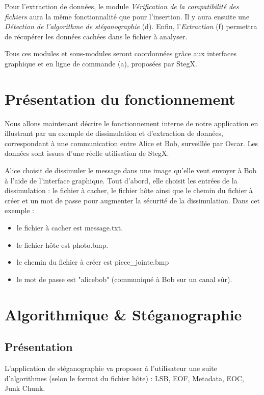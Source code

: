 \documentclass[11pt]{article}
\begin{document}
Pour l'extraction de données, le module \textit{Vérification de la compatibilité 
des fichiers} aura la même fonctionnalité que pour l'insertion.
Il y aura ensuite une \textit{Détection de l'algorithme de stéganographie} 
(d). 
Enfin, l'\textit{Extraction} (f) permettra de récupérer les données cachées 
dans le fichier à analyser. 

Tous ces modules et sous-modules seront coordonnées grâce aux interfaces 
graphique et en ligne de commande (a), proposées par StegX. 

\section{Présentation du fonctionnement}

Nous allons maintenant décrire le fonctionnement interne de notre
application en illustrant par un exemple de dissimulation et d'extraction 
de données, correspondant à une communication entre Alice et Bob, surveillée 
par Oscar. Les données sont issues d'une réelle utilisation de StegX. 

Alice choisit de dissimuler le message dans une image qu'elle veut envoyer 
à Bob à l'aide de l'interface graphique. 
Tout d'abord, elle choisit les entrées de la dissimulation : le fichier 
à cacher, le fichier hôte ainsi que le chemin du fichier à créer et un mot 
de passe pour augmenter la sécurité de la dissimulation. \newline
Dans cet exemple : 
\begin{itemize}
\item le fichier à cacher est message.txt. 
\item le fichier hôte est photo.bmp. 
\item le chemin du fichier à créer est piece\_jointe.bmp
\item le mot de passe est "alicebob" (communiqué à Bob sur un canal sûr).
\end{itemize}

\section{Algorithmique \& Stéganographie}

\subsection{Présentation}

L'application de stéganographie va proposer à l'utilisateur une suite 
d'algorithmes (selon le format du fichier hôte) : 
LSB, EOF, Metadata, EOC, Junk Chunk. 
\end{document}

